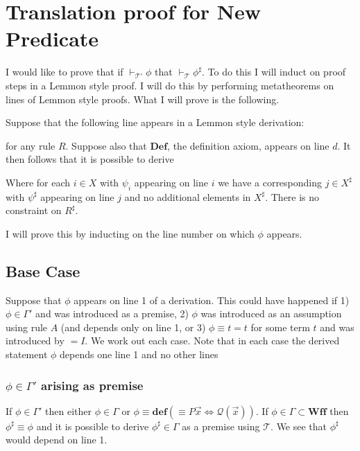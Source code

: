 \documentclass[12pt]{article}
\newcommand{\bv}[1]{\boldsymbol{#1}}
\newcommand{\mc}[1]{\mathcal{#1}}
\newcommand{\bc}[1]{\bv{\mc{#1}}}
\begin{document}
\section*{Translation proof for New Predicate}

I would like to prove that if $\vdash_{\bc{T}'}\phi$ that $\vdash_{\bc{T}}\phi^{\sharp}$. To do this I will induct on proof steps in a Lemmon style proof. I will do this by performing metatheorems on lines of Lemmon style proofs. What I will prove is the following.

Suppose that the following line appears in a Lemmon style derivation:

\begin{ND}[][][][][.6\linewidth]
\end{ND}

for any rule $R$.
Suppose also that $\textbf{Def}$, the definition axiom, appears on line $d$. It then follows that it is possible to derive

\begin{ND}[][][][][.6\linewidth]
\end{ND}

Where for each $i\in X$ with $\psi_i$ appearing on line $i$ we have a corresponding $j \in X^{\sharp}$ with $\psi^{\sharp}$ appearing on line $j$ and no additional elements in $X^{\sharp}$. There is no constraint on $R^{\sharp}$.

I will prove this by inducting on the line number on which $\phi$ appears.

\subsection*{Base Case}

Suppose that $\phi$ appears on line 1 of a derivation. This could have happened if 1) $\phi \in \Gamma'$ and was introduced as a premise, 2) $\phi$ was introduced as an assumption using rule $A$ (and depends only on line 1, or 3) $\phi \equiv t=t$ for some term $t$ and was introduced by $=I$. We work out each case. Note that in each case the derived statement $\phi$ depends one line 1 and no other lines

\subsubsection*{$\phi \in \Gamma'$ arising as premise}

If $\phi \in \Gamma'$ then either $\phi \in \Gamma$ or $\phi \equiv \textbf{def} (\equiv P\vec{x} \Leftrightarrow \mc{Q}(\vec{x}))$. If $\phi \in \Gamma \subset \textbf{Wff}$ then $\phi^{\sharp} \equiv \phi$ and it is possible to derive $\phi^{\sharp} \in \Gamma$ as a premise using $\bc{T}$. We see that $\phi^{\sharp}$ would depend on line 1.
\end{document}
